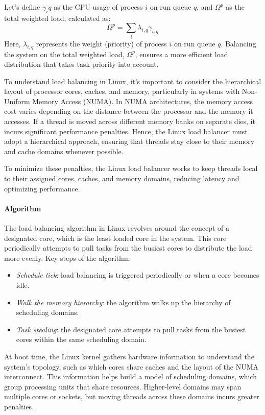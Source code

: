 Let's define $\gamma_iq$ as the CPU usage of process $i$ on run queue $q$, and $\Omega^p$ as the total weighted load, calculated as:
\[\Omega^p=\sum_i\lambda_{i,q}\gamma_{i,q}\]
Here, $\lambda_{i,q}$ represents the weight (priority) of process $i$ on run queue $q$.
Balancing the system on the total weighted load, $\Omega^p$, ensures a more efficient load distribution that takes task priority into account.

To understand load balancing in Linux, it's important to consider the hierarchical layout of processor cores, caches, and memory, particularly in systems with Non-Uniform Memory Access (NUMA). 
In NUMA architectures, the memory access cost varies depending on the distance between the processor and the memory it accesses. 
If a thread is moved across different memory banks on separate dies, it incurs significant performance penalties. 
Hence, the Linux load balancer must adopt a hierarchical approach, ensuring that threads stay close to their memory and cache domains whenever possible.

To minimize these penalties, the Linux load balancer works to keep threads local to their assigned cores, caches, and memory domains, reducing latency and optimizing performance.

\paragraph*{Algorithm}
The load balancing algorithm in Linux revolves around the concept of a designated core, which is the least loaded core in the system. 
This core periodically attempts to pull tasks from the busiest cores to distribute the load more evenly.
Key steps of the algorithm:
\begin{itemize}
    \item \textit{Schedule tick}: load balancing is triggered periodically or when a core becomes idle.
    \item \textit{Walk the memory hierarchy}: the algorithm walks up the hierarchy of scheduling domains.
    \item \textit{Task stealing}: the designated core attempts to pull tasks from the busiest cores within the same scheduling domain.
\end{itemize}
At boot time, the Linux kernel gathers hardware information to understand the system's topology, such as which cores share caches and the layout of the NUMA interconnect. 
This information helps build a model of scheduling domains, which group processing units that share resources. 
Higher-level domains may span multiple cores or sockets, but moving threads across these domains incurs greater penalties.

